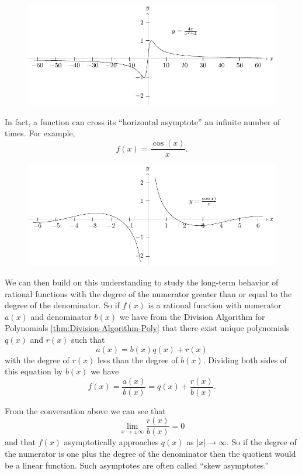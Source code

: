 \documentclass[
]{book}
\theoremstyle{definition}
\theoremstyle{definition}
\theoremstyle{definition}
\theoremstyle{remark}
\begin{document}
\begin{figure}

{\centering \includegraphics[width=0.5\linewidth]{tikz/rational3} 

}

\end{figure}

In fact, a function can cross its ``horizontal asymptote'' an infinite number of times. For example,
\[f(x)=\frac{\cos(x)}{x}.\]

\begin{figure}

{\centering \includegraphics[width=0.5\linewidth]{tikz/rational4} 

}

\end{figure}

We can then build on this understanding to study the long-term behavior of rational functions with the degree of the numerator greater than or equal to the degree of the denominator.
So if \(f(x)\) is a rational function with numerator \(a(x)\) and denominator \(b(x)\) we have from the Division Algorithm for Polynomials \ref{thm:Division-Algorithm-Poly} that there exist unique polynomials \(q(x)\) and \(r(x)\) such that
\[a(x)=b(x) q(x) + r(x)\] with the degree of \(r(x)\) less than the degree of \(b(x)\). Dividing both sides of this equation by \(b(x)\) we have
\[f(x)=\frac{a(x)}{b(x)} = q(x) + \frac{r(x)}{b(x)}.\]

From the conversation above we can see that \[\lim_{x\rightarrow \pm \infty} \frac{r(x)}{b(x)} =0\] and that \(f(x)\) asymptotically approaches \(q(x)\) as \(|x| \rightarrow \infty\). So if the degree of the numerator is one plus the degree of the denominator then the quotient would be a linear function. Such asymptotes are often called ``skew asymptotes.''
\end{document}
